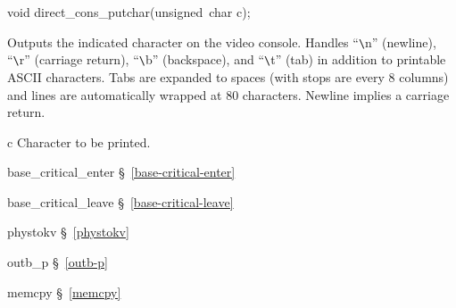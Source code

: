 \label{direct-cons-putchar}
\begin{apisyn}

	\funcproto void direct_cons_putchar(unsigned~char c);
\end{apisyn}
\begin{apidesc}
	Outputs the indicated character on the video console.
	Handles
	``\verb|\|n'' (newline),
	``\verb|\|r'' (carriage return),
	``\verb|\|b'' (backspace), and
	``\verb|\|t'' (tab)
	in addition to printable ASCII characters.
	Tabs are expanded to spaces (with stops are every 8 columns)
	and lines are automatically wrapped at 80 characters.
	Newline implies a carriage return.
\end{apidesc}
\begin{apiparm}
	\item[c]
		Character to be printed.
\end{apiparm}
\begin{apidep}
	\item[base_critical_enter]	\S~\ref{base-critical-enter}
	\item[base_critical_leave]	\S~\ref{base-critical-leave}
	\item[phystokv]			\S~\ref{phystokv}
	\item[outb_p]			\S~\ref{outb-p}
	\item[memcpy]			\S~\ref{memcpy}
\end{apidep}

